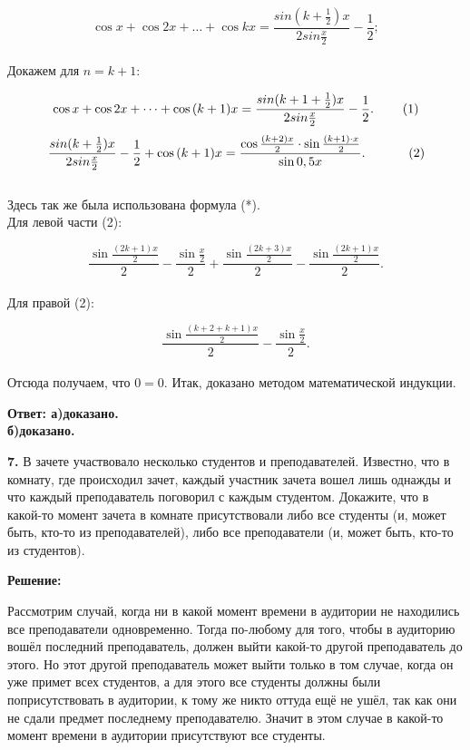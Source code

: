 \documentclass[a4paper,12pt]{article} %
\begin{document}
\[ \cos{x} + \cos2x + \dots + \cos{kx} = \frac{sin(k+\frac{1}{2})x}{2sin\frac{x}{2}} - \frac{1}{2};\]\\
Докажем для $n = k + 1:$

\[ \cos{x} + \cos2x + \dots + \cos{(k+1)x} = \frac{sin(k+1+\frac{1}{2})x}{2sin\frac{x}{2}} - \frac{1}{2}.\hspace{8mm} (1)\]
\[ \frac{sin(k+\frac{1}{2})x}{2sin\frac{x}{2}} - \frac{1}{2} + \cos{(k+1)x} = \frac{\cos{\frac{(k+2)x}{2}}\cdot \sin{\frac{(k+1)\cdot x}{2}}}{\sin{0,5x}}.\hspace{12mm} (2)\]\\
Здесь так же была использована формула (*).\\
Для левой части (2):

\[ \frac{\sin{\frac{(2k+1)x}{2}}}{2} - \frac{\sin{\frac{x}{2}}}{2} + \frac{\sin{\frac{(2k+3)x}{2}}}{2} - \frac{\sin{\frac{(2k+1)x}{2}}}{2}.\]\\
Для правой (2):

\[ \frac{\sin{\frac{(k+2+k+1)x}{2}}}{2} - \frac{\sin{\frac{x}{2}}}{2} .\]\\
Отсюда получаем, что $ 0 = 0 .$ Итак, доказано методом математической индукции.

\begin{flushright}
\begin{large}
\textbf {Ответ: а)доказано.\\б)доказано.}
\end{large}
\end{flushright}


{\bf 7.} В зачете участвовало несколько студентов и преподавателей. Известно, что в комнату, где происходил зачет, каждый участник зачета
вошел лишь однажды и что каждый преподаватель поговорил с каждым студентом. Докажите, что в какой-то момент зачета в комнате
присутствовали либо все студенты (и, может быть, кто-то из преподавателей), либо все преподаватели (и, может быть, кто-то из студентов).
\begin{center}
\bfseries
{\Large Решение: }
\end{center}
Рассмотрим случай, когда ни в какой момент времени в аудитории не находились все преподаватели одновременно. Тогда по-любому для того, чтобы в аудиторию вошёл последний преподаватель, должен выйти какой-то другой преподаватель до этого. Но этот другой преподаватель может выйти только в том случае, когда он уже примет всех студентов, а для этого все студенты должны были поприсутствовать в аудитории, к тому же никто оттуда ещё не ушёл, так как они не сдали предмет последнему преподавателю. Значит в этом случае в какой-то момент времени в аудитории присутствуют все студенты.
\end{document}
